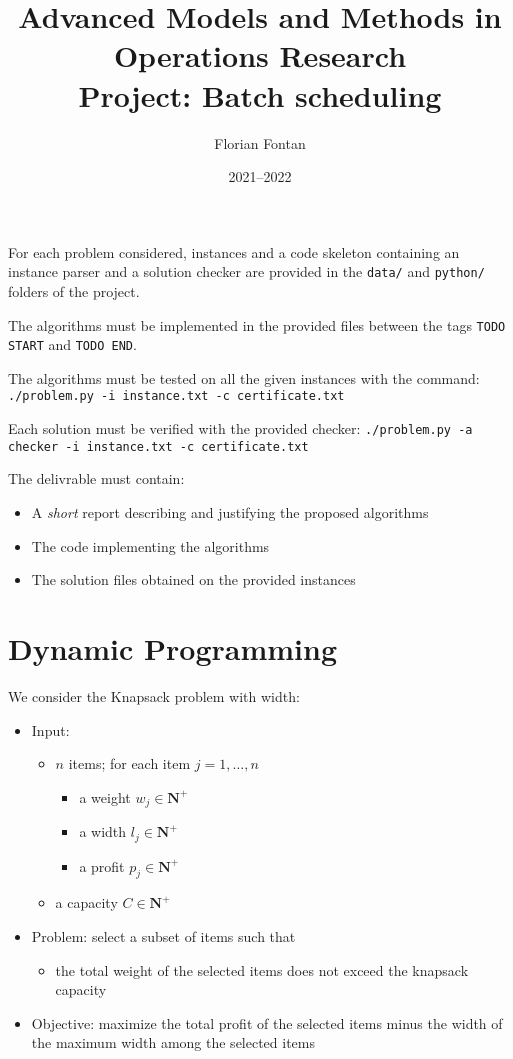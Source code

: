 \documentclass[a4paper]{article}
\author{Florian Fontan}
\title{Advanced Models and Methods in Operations Research \\ Project: Batch scheduling}
\date{2021--2022}
\newcommand{\N}{\mathbf{N}}
\begin{document}
\maketitle

For each problem considered, instances and a code skeleton containing an instance parser and a solution checker are provided in the \texttt{data/} and \texttt{python/} folders of the project.

The algorithms must be implemented in the provided files between the tags \texttt{TODO START} and \texttt{TODO END}.

The algorithms must be tested on all the given instances with the command: \texttt{./problem.py -i instance.txt -c certificate.txt}

Each solution must be verified with the provided checker: \texttt{./problem.py -a checker -i instance.txt -c certificate.txt}

\bigskip

The delivrable must contain:
\begin{itemize}
  \item A \emph{short} report describing and justifying the proposed algorithms
  \item The code implementing the algorithms
  \item The solution files obtained on the provided instances
\end{itemize}

\section{Dynamic Programming}

We consider the Knapsack problem with width:
\begin{itemize}
  \item Input:
    \begin{itemize}
      \item $n$ items; for each item $j = 1, \dots, n$
        \begin{itemize}
          \item a weight $w_j \in \N^+$
          \item a width $l_j \in \N^+$
          \item a profit $p_j \in \N^+$
        \end{itemize}
      \item a capacity $C \in \N^+$
    \end{itemize}
  \item Problem: select a subset of items such that
    \begin{itemize}
      \item the total weight of the selected items does not exceed the knapsack capacity
    \end{itemize}
  \item Objective: maximize the total profit of the selected items minus the width of the maximum width among the selected items
\end{itemize}
\end{document}
